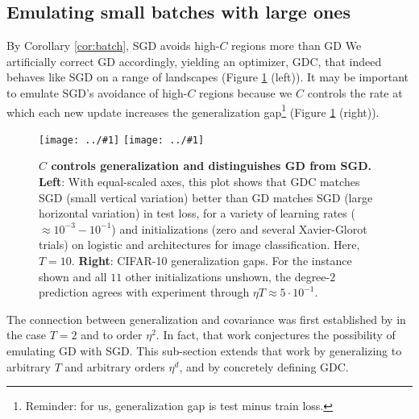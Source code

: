 \documentclass{article}
\theoremstyle{plain}
\theoremstyle{definition}
\newcommand{\plotmooh}[3]{\texttt{[image: ../\#1]}}
\begin{document}

    \subsection{Emulating small batches with large ones}
        By Corollary \ref{cor:batch}, SGD avoids high-$C$ regions more than GD
        We artificially correct GD accordingly, yielding an optimizer, GDC,
        that indeed behaves like SGD on a range of landscapes (Figure
        \ref{fig:batchandgen} (left)).  It may be important to emulate SGD's
        avoidance of high-$C$ regions because we $C$ controls the rate at which
        each new update increases the generalization gap\footnote{Reminder: for
        us, generalization gap is test minus train loss.} (Figure
        \ref{fig:batchandgen} (right)).
        
        \begin{figure}[h!] 
            \centering
            \plotmooh{plots/new-big-bm-new}{}{3.0cm}
            \plotmooh{plots/rebut-gen-cifar-lenet-4}{}{3.0cm}
            \caption{
                {\bf $C$ controls generalization and distinguishes GD from
                SGD.}
                {\bf Left}: With equal-scaled axes, this plot shows that GDC
                matches SGD (small vertical variation) better than GD matches
                SGD (large horizontal variation) in test loss, for a variety of
                learning rates ($\approx 10^{-3}-10^{-1}$) and initializations
                (zero and several Xavier-Glorot trials) on logistic and
                architectures for image classification.  Here, $T=10$. 
                {\bf Right}: CIFAR-10 generalization gaps.
                For the instance shown and all $11$ other
                initializations unshown, the degree-$2$ prediction agrees with
                experiment through $\eta T \approx 5\cdot 10^{-1}$.
            }
            \label{fig:batchandgen}
        \end{figure}

        The connection between generalization and covariance was first
        established by \citet{ro18} in the case $T=2$ and to order $\eta^2$. 
        In fact, that work conjectures the possibility of emulating GD with
        SGD.  This sub-section extends that work by generalizing to arbitrary
        $T$ and arbitrary orders $\eta^d$, and by concretely defining GDC.
\end{document}
